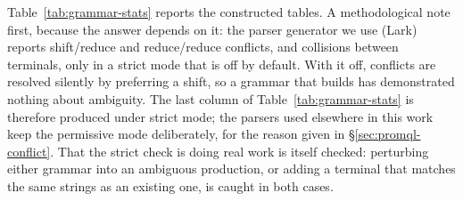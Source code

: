 \begin{remark}\label{rem:strict-mode}
Table~\ref{tab:grammar-stats} reports the constructed tables. A methodological note
first, because the answer depends on it: the parser generator we use (Lark) reports
shift/reduce and reduce/reduce conflicts, and collisions between terminals, only in a
strict mode that is off by default. With it off, conflicts are resolved silently by
preferring a shift, so a grammar that builds has demonstrated nothing about ambiguity.
The last column of Table~\ref{tab:grammar-stats} is therefore produced under strict
mode; the parsers used elsewhere in this work keep the permissive mode deliberately, for
the reason given in \S\ref{sec:promql-conflict}. That the strict check is doing real work
is itself checked: perturbing either grammar into an ambiguous production, or adding a
terminal that matches the same strings as an existing one, is caught in both cases.
\end{remark}

